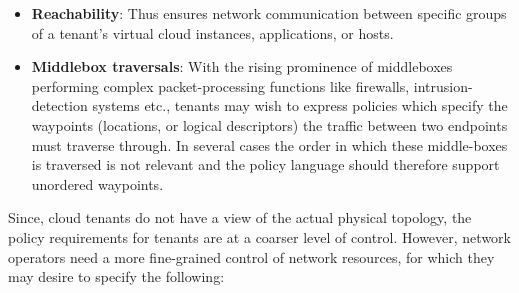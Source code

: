 \begin{itemize}
\item \textbf{Reachability}: Thus ensures network communication
  between specific groups of a tenant's virtual cloud instances,
  applications, or hosts. 
\item \textbf{Middlebox traversals}: With the rising prominence of
  middleboxes performing complex packet-processing functions like
  firewalls, intrusion-detection systems etc., tenants may wish to
  express policies which specify the waypoints (locations, or logical
  descriptors) the traffic between two
  endpoints must traverse through.	  
    In several cases  the order in which these middle-boxes is traversed
    is not relevant and the policy language should therefore support unordered waypoints.
\end{itemize}

Since, cloud tenants do not have a view of the actual physical
topology, the policy requirements for tenants are at a coarser level
of control. However, network operators need a more fine-grained
control of network resources, for which they may desire to specify the
following:

